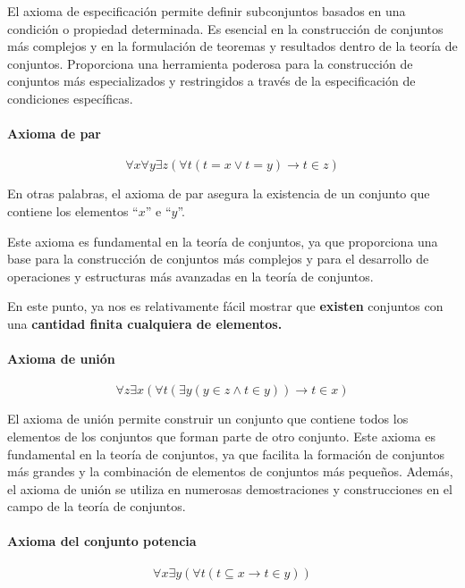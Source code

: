 El axioma de especificación permite definir subconjuntos basados en una condición o propiedad determinada. Es esencial en la construcción de conjuntos más complejos y en la formulación de teoremas y resultados dentro de la teoría de conjuntos. Proporciona una herramienta poderosa para la construcción de conjuntos más especializados y restringidos a través de la especificación de condiciones específicas.

\paragraph*{Axioma de par}\vspace{-1em}
\begin{equation*}
	\forall x\forall y\exists z(\forall t\left(t=x\lor t=y\right)\rightarrow t\in z)
\end{equation*}

En otras palabras, el axioma de par asegura la existencia de un conjunto que contiene los elementos “$x$” e “$y$”.

Este axioma es fundamental en la teoría de conjuntos, ya que proporciona una base para la construcción de conjuntos más complejos y para el desarrollo de operaciones y estructuras más avanzadas en la teoría de conjuntos.

En este punto, ya nos es relativamente fácil mostrar que \textbf{existen} conjuntos con una \textbf{cantidad finita cualquiera de elementos.}

\paragraph*{Axioma de unión}\vspace{-1em}

\begin{equation*}
	\forall z\exists x\left(\forall t\left(\exists y\left(y\in z\land t\in y\right)\right)\rightarrow t\in x\right)
\end{equation*}

El axioma de unión permite construir un conjunto que contiene todos los elementos de los conjuntos que forman parte de otro conjunto. Este axioma es fundamental en la teoría de conjuntos, ya que facilita la formación de conjuntos más grandes y la combinación de elementos de conjuntos más pequeños. Además, el axioma de unión se utiliza en numerosas demostraciones y construcciones en el campo de la teoría de conjuntos.

\paragraph*{Axioma del conjunto potencia}\vspace{-1em}
\begin{equation*}
	\forall x\exists y\left(\forall t\left(t\subseteq x\rightarrow t\in y\right)\right)
\end{equation*}


